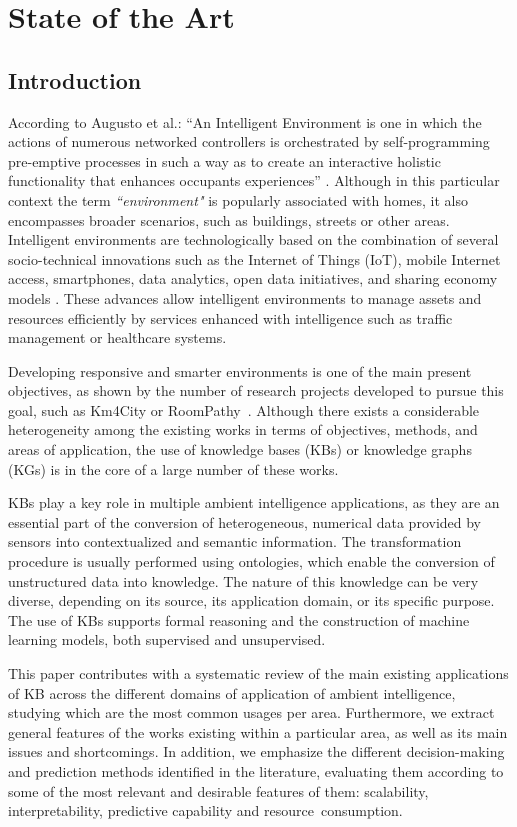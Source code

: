 \chapter{State of the Art}
\label{chap:soa}

\section{Introduction}
According to Augusto et al.: ``An Intelligent Environment is one in which the actions of numerous networked controllers is orchestrated by self-programming pre-emptive processes in such a way as to create an interactive holistic functionality that enhances occupants experiences'' \citep{augustoetal}. Although in this particular context the term \textit{``environment"} is popularly associated with homes, it also encompasses broader scenarios, such as buildings, streets or other areas. Intelligent environments are technologically based on the combination of several socio-technical innovations such as the Internet of Things (IoT), mobile Internet access, smartphones, data analytics, open data initiatives, and sharing economy models \citep{ANAND2018795}. These advances allow intelligent environments to manage assets and resources efficiently by services enhanced with intelligence such as traffic management or healthcare systems. 

Developing responsive and smarter environments is one of the main present objectives, as shown by the number of research projects developed to pursue this goal, such as Km4City \citep{km4city} or RoomPathy~\citep{roompathy}. Although there exists a considerable heterogeneity among the existing works in terms of objectives, methods, and areas of application, the use of knowledge bases (KBs) or knowledge graphs (KGs) is in the core of a large number of these works.

KBs play a key role in multiple ambient intelligence applications, as they are an essential part of the conversion of heterogeneous, numerical data provided by sensors into contextualized and semantic information. The transformation procedure is usually performed using ontologies, which enable the conversion of unstructured data into knowledge. The nature of this knowledge can be very diverse, depending on its source, its application domain, or its specific purpose. The use of KBs supports formal reasoning and the construction of machine learning models, both supervised and unsupervised. 

This paper contributes with a systematic review of the main existing applications of KB across the different domains of application of ambient intelligence, studying which are the most common usages per area. Furthermore, we extract general features of the works existing within a particular area, as well as its main issues and shortcomings.  In addition, we emphasize the different decision-making and prediction methods identified in the literature, evaluating them according to some of the most relevant and desirable features of them: scalability, interpretability, predictive capability and resource~consumption.


